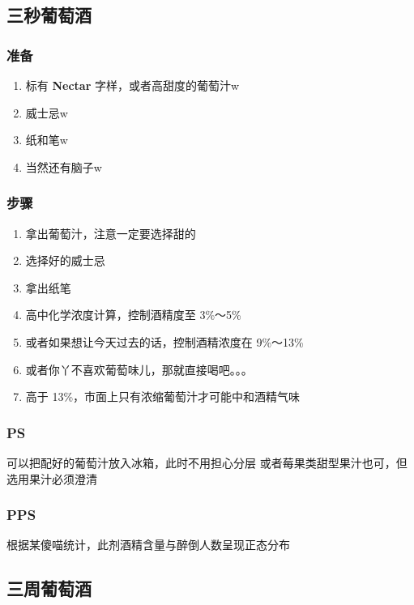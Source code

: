 \documentclass[12pt, a4paper]{ctexart}
\begin{document}
\subsection{三秒葡萄酒}
\subsubsection{准备}
\begin{enumerate}
    \item{标有 \textbf{Nectar} 字样，或者高甜度的葡萄汁w}
    \item{威士忌w}
    \item{纸和笔w}
    \item{当然还有脑子w}
\end{enumerate}

\subsubsection{步骤}
\begin{enumerate}
    \item{拿出葡萄汁，注意一定要选择甜的}
    \item{选择好的威士忌}
    \item{拿出纸笔}
    \item{高中化学浓度计算，控制酒精度至 3\%～5\%}
    \item{或者如果想让今天过去的话，控制酒精浓度在 9\%～13\%}
    \item{或者你丫不喜欢葡萄味儿，那就直接喝吧。。。}
    \item{高于 13\%，市面上只有浓缩葡萄汁才可能中和酒精气味}
\end{enumerate}

\subsubsection{PS}
可以把配好的葡萄汁放入冰箱，此时不用担心分层
或者莓果类甜型果汁也可，但选用果汁必须澄清

\subsubsection{PPS}
根据某傻喵统计，此剂酒精含量与醉倒人数呈现正态分布

\subsection{三周葡萄酒}
\end{document}
